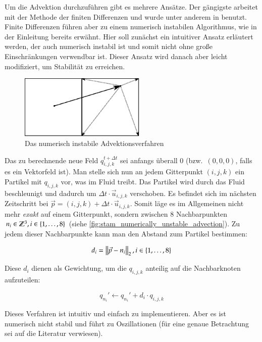 Um die Advektion durchzuführen gibt es mehrere Ansätze. Der gängigste arbeitet
mit der Methode der finiten Differenzen und wurde unter anderem in
\cite{Foster} benutzt. Finite Differenzen führen aber zu einem numerisch
instabilen Algorithmus, wie in der Einleitung bereits erwähnt. Hier
soll zunächst ein intuitiver Ansatz erläutert werden, der auch
numerisch instabil ist und somit nicht ohne große Einschränkungen
verwendbar ist. Dieser Ansatz wird danach aber leicht modifiziert, um
Stabilität zu erreichen.

\begin{figure}[ht]
\centering
\includegraphics[width=6cm]{images/advection_bad}
\caption{Das numerisch instabile Advektionsverfahren}
\label{fig:stam_numerically_unstable_advection}
\end{figure}

Das zu berechnende neue Feld $q_{i,j,k}^{t+\Delta t}$ sei anfangs
überall 0 (bzw.\ $(0,0,0)$, falls es ein Vektorfeld ist). Man stelle
sich nun an jedem Gitterpunkt $(i,j,k)$ ein Partikel mit
 $q_{i,j,k}$ vor, was im Fluid treibt. Das
Partikel wird durch das Fluid beschleunigt und dadurch um $\Delta t
\cdot \vec{u}_{i,j,k}$ verschoben. Es befindet sich im nächsten
Zeitschritt bei $\vec{p}=(i,j,k)+\Delta t \cdot
\vec{u}_{i,j,k}$. Somit läge es im Allgemeinen nicht mehr \emph{exakt}
auf einem Gitterpunkt, sondern zwischen 8 Nachbarpunkten $n_i \in
\PimiddyGanz^3, i \in \{1,\ldots,8\}$ (siehe
\autoref{fig:stam_numerically_unstable_advection}). Zu jedem dieser
Nachbarpunkte kann man den Abstand zum Partikel bestimmen:

\begin{equation}
d_i = \PimiddyNorm{2}{\vec{p} - n_i}, i \in \{1,\ldots,8\}
\end{equation}

Diese $d_i$ dienen als Gewichtung, um die  $q_{i,j,k}$
anteilig auf die Nachbarknoten aufzuteilen:

\begin{equation}
q_{n_i}' \leftarrow q_{n_i}' + d_i \cdot q_{i,j,k}
\end{equation}

Dieses Verfahren ist intuitiv und einfach zu implementieren. Aber es ist
numerisch nicht stabil und führt zu Oszillationen (für eine genaue Betrachtung
sei auf die Literatur verwiesen).

